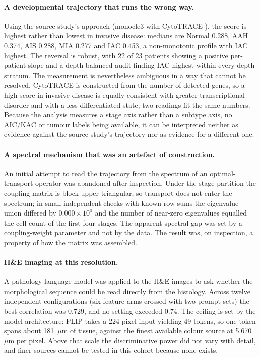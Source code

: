 \paragraph{A developmental trajectory that runs the wrong way.} Using the source study's
approach (monocle3 \citep{cao2019monocle3} with CytoTRACE \citep{gulati2020cytotrace}), the
score is highest rather than lowest in invasive disease: medians are Normal 0.288, AAH
0.374, AIS 0.288, MIA 0.277 and IAC 0.453, a non-monotonic profile with IAC highest. The
reversal is robust, with 22 of 23 patients showing a positive per-patient slope and a
depth-balanced audit finding IAC highest within every depth stratum. The measurement is
nevertheless ambiguous in a way that cannot be resolved. CytoTRACE is constructed from the
number of detected genes, so a high score in invasive disease is equally consistent with
greater transcriptional disorder and with a less differentiated state; two readings fit the
same numbers. Because the analysis measures a stage axis rather than a subtype axis, no
AIC/KAC or tumour labels being available, it can be interpreted neither as evidence against
the source study's trajectory nor as evidence for a different one.

\paragraph{A spectral mechanism that was an artefact of construction.} An initial attempt to
read the trajectory from the spectrum of an optimal-transport operator
\citep{schiebinger2019wot,lange2022cellrank} was abandoned after inspection. Under the stage
partition the coupling matrix is block upper triangular, so transport does not enter the
spectrum; in small independent checks with known row sums the eigenvalue union differed by
$0.000\times10^{0}$ and the number of near-zero eigenvalues equalled the cell count of the
first four stages. The apparent spectral gap was set by a coupling-weight parameter and not
by the data. The result was, on inspection, a property of how the matrix was assembled.

\paragraph{H\&E imaging at this resolution.} A pathology-language model
\citep{huang2023plip} was applied to the H\&E images to ask whether the morphological sequence
could be read directly from the histology. Across twelve independent configurations (six
feature arms crossed with two prompt sets) the best correlation was 0.729, and no setting
exceeded 0.74. The ceiling is set by the model architecture: PLIP takes a 224-pixel input
yielding 49 tokens, so one token spans about 181~$\mu$m of tissue, against the finest
available colour source at 5.670~$\mu$m per pixel. Above that scale the discriminative power
did not vary with detail, and finer sources cannot be tested in this cohort because none
exists.

